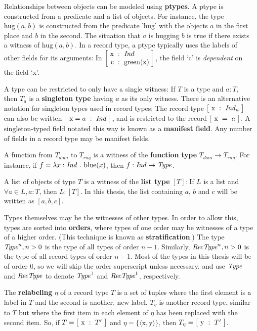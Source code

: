 Relationships between objects can be modeled using \textbf{ptypes}.
A ptype is constructed from a predicate and a list of objects.
For instance, the type $\text{hug}(a,b)$ is constructed from the predicate 'hug' with the objects $a$ in the first place and $b$ in the second.
The situation that $a$ is hugging $b$ is true if there exists a witness of $\text{hug}(a,b)$.
In a record type, a ptype typically uses the labels of other fields for its arguments:
In $\rec{\text{x} &:& \type{Ind} \\ \text{c} &:& \text{green}(\text{x})}$, the field `c' is \textit{dependent} on the field `x'.

A type can be restricted to only have a single witness:
If $T$ is a type and $a:T$, then $T_a$ is a \textbf{singleton type} having $a$ as its only witness.
There is an alternative notation for singleton types used in record types:
The record type $\rec{\text{x} &:& \type{Ind}_a}$ can also be written $\rec{\text{x}=a &:& \type{Ind}}$, and is restricted to the record $\rec{\text{x} &=& a}$.
A singleton-typed field notated this way is known as a \textbf{manifest field}.
Any number of fields in a record type may be manifest fields.

A function from $T_{dom}$ to $T_{rng}$ is a witness of the \textbf{function type} $T_{dom} \rightarrow T_{rng}$.
For instance, if $f = \lambda x : \type{Ind}\ .\ \text{blue}(x)$, then $f : \mathit{Ind} \rightarrow \mathit{Type}$.

A list of objects of type $T$ is a witness of the \textbf{list type} $[T]$:
If $L$ is a list and $\forall a \in L, a : T$, then $L : [T]$.
In this thesis, the list containing $a$, $b$ and $c$ will be written as $[a, b, c]$.

Types themselves may be the witnesses of other types.
In order to allow this, types are sorted into \textbf{orders}, where types of one order may be witnesses of a type of a higher order.
(This technique is known as \textbf{stratification}.)
The type $\mathit{Type}^n, n > 0$ is the type of all types of order $n - 1$.
Similarly, $\mathit{RecType}^n, n > 0$ is the type of all record types of order $n - 1$.
Most of the types in this thesis will be of order $0$, so we will skip the order superscript unless necessary, and use $\mathit{Type}$ and $\mathit{RecType}$ to denote $\mathit{Type}^1$ and $\mathit{RecType}^1$, respectively.

The \textbf{relabeling} $\eta$ of a record type $T$ is a set of tuples where the first element is a label in $T$ and the second is another, new label.
$T_\eta$ is another record type, similar to $T$ but where the first item in each element of $\eta$ has been replaced with the second item.
So, if $T = \rec{\text{x} &:& T'}$ and $\eta = \{\langle \text{x}, \text{y}\rangle\}$, then $T_\eta = \rec{\text{y} &:& T'}$.

